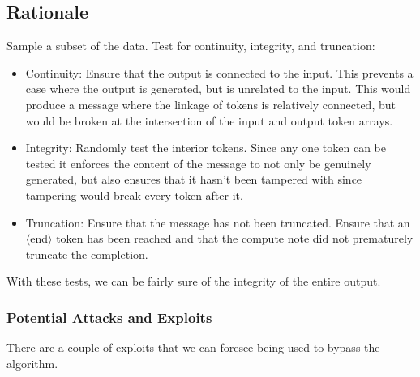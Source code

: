 \documentclass{article}
\begin{document}
\subsection{Rationale}
Sample a subset of the data.
Test for continuity, integrity, and truncation:
\begin{itemize}
    \item Continuity: Ensure that the output is connected to the input. This prevents a case where the output is generated, but is unrelated to the input. 
    This would produce a message where the linkage of tokens is relatively connected, but would be broken at the intersection of the input and output token arrays.
    \item Integrity: Randomly test the interior tokens. 
    Since any one token can be tested it enforces the content of the message to not only be genuinely generated, but also ensures that it hasn't been tampered with since tampering would break every token after it.
    \item Truncation: Ensure that the message has not been truncated. Ensure that an $\langle$end$\rangle$ token has been reached and that the compute note did not prematurely truncate the completion.
\end{itemize}
 With these tests, we can be fairly sure of the integrity of the entire output.


\subsubsection*{Potential Attacks and Exploits}

There are a couple of exploits that we can foresee being used to bypass the algorithm.
\end{document}
